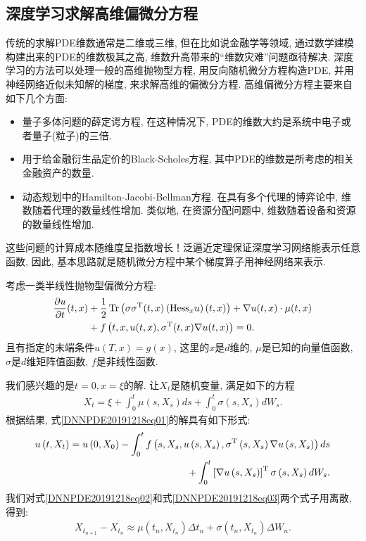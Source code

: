 \subsection{深度学习求解高维偏微分方程}
传统的求解PDE维数通常是二维或三维, 但在比如说金融学等领域, 通过数学建模构建出来的PDE的维数极其之高, 维数升高带来的“维数灾难”问题亟待解决.
深度学习的方法可以处理一般的高维抛物型方程, 用反向随机微分方程构造PDE, 并用神经网络近似未知解的梯度, 来求解高维的偏微分方程. 高维偏微分方程主要来自如下几个方面:
\begin{itemize}
\item 量子多体问题的薛定谔方程, 在这种情况下, PDE的维数大约是系统中电子或者量子(粒子)的三倍.
\item 用于给金融衍生品定价的Black-Scholes方程, 其中PDE的维数是所考虑的相关金融资产的数量.
\item 动态规划中的Hamilton-Jacobi-Bellman方程. 在具有多个代理的博弈论中, 维数随着代理的数量线性增加. 类似地, 在资源分配问题中, 维数随着设备和资源的数量线性增加.
\end{itemize}
这些问题的计算成本随维度呈指数增长！泛逼近定理保证深度学习网络能表示任意函数, 因此, 基本思路就是随机微分方程中某个梯度算子用神经网络来表示. 

\begin{example}
考虑一类半线性抛物型偏微分方程:
\begin{align}\label{DNNPDE20191218eq01}
\frac{\partial u}{\partial t}(t,  x)&+\frac{1}{2} \operatorname{Tr}\left(\sigma \sigma^{\mathrm{T}}(t,  x)\left(\mathrm{Hess}_{x} u\right)(t,  x)\right)+\nabla u(t,  x) \cdot \mu(t,  x)\notag\\
                               &+f\left(t,  x,  u(t,  x),  \sigma^{\mathrm{T}}(t,  x) \nabla u(t,  x)\right)=0.
\end{align}
且有指定的末端条件$u(T, x)=g(x)$, 这里的$x$是$d$维的, $\mu$是已知的向量值函数, $\sigma$是$d$维矩阵值函数, $f$是非线性函数.
\end{example}

我们感兴趣的是$t=0, x=\xi$的解. 让$X_t$是随机变量, 满足如下的方程
\begin{align}\label{DNNPDE20191218eq02}
  X_{t}=\xi+\int_{0}^{t} \mu\left(s,  X_{s}\right) d s+\int_{0}^{t} \sigma\left(s,  X_{s}\right) d W_{s}.
\end{align}
根据结果\cite{Han2018PNAS, Sirignano2018, Raissi2017}, 式\eqref{DNNPDE20191218eq01}的解具有如下形式:
\begin{align}\label{DNNPDE20191218eq03}
  u\left(t,  X_{t}\right)=u\left(0,  X_{0}\right)-\int_{0}^{t} f\left(s,  X_{s},  u\left(s,  X_{s}\right),  \sigma^{\mathrm{T}}\left(s,  X_{s}\right) \nabla u\left(s,  X_{s}\right)\right) d s\notag\\
                        \quad +\int_{0}^{t}\left[\nabla u\left(s,  X_{s}\right)\right]^{\mathrm{T}} \sigma\left(s,  X_{s}\right) d W_{s}.
\end{align}
我们对式\eqref{DNNPDE20191218eq02}和式\eqref{DNNPDE20191218eq03}两个式子用离散, 得到:
\begin{align}\label{DNNPDE20191218eq04}
  X_{t_{n+1}}-X_{t_{n}} \approx \mu\left(t_{n},  X_{t_{n}}\right) \Delta t_{n}+\sigma\left(t_{n},  X_{t_{n}}\right) \Delta W_{n}.
\end{align}

